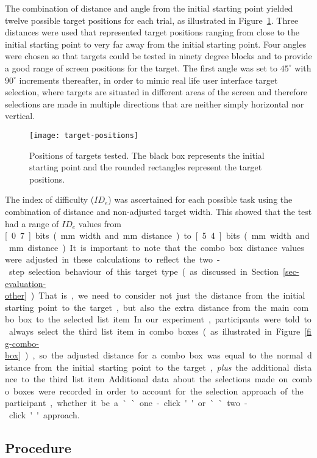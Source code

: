 \documentclass[reviewcopy]{elsart}
\begin{document}
The combination of distance and angle from the initial starting point
yielded twelve possible target positions for each trial, as illustrated
in Figure~\ref{fig-target-positions}. Three distances were used that
represented target positions ranging from close to the initial starting
point to very far away from the initial starting point. Four angles were
chosen so that targets could be tested in ninety degree blocks and to
provide a good range of screen positions for the target. The first angle
was set to \(45^{\circ}\) with \(90^{\circ}\) increments thereafter, in
order to mimic real life user interface target selection, where targets
are situated in different areas of the screen and therefore selections
are made in multiple directions that are neither simply horizontal nor
vertical.


\begin{figure}
	\centering
	\texttt{[image: target-positions]}
	\caption{Positions of targets tested. The black box represents the
	initial starting point and the rounded rectangles represent the
	target positions.}
	\label{fig-target-positions}
\end{figure}


The index of difficulty (\(\mathit{ID}_{e}\)) was ascertained for each
possible task using the combination of distance and non-adjusted target
width. This showed that the test had a range of \(\mathit{ID}_{e}\)
values from \unit[0.7]{bits} (\unit[63]{mm} width and \unit[160]{mm}
distance) to \unit[5.4]{bits} (\unit[4]{mm} width and \unit[40]{mm}
distance). It is important to note that the combo box distance values
were adjusted in these calculations to reflect the two-step selection
behaviour of this target type (as discussed in
Section~\ref{sec-evaluation-other}). That is, we need to consider not
just the distance from the initial starting point to the target, but
also the extra distance from the main combo box to the selected list
item. In our experiment, participants were told to always select the
third list item in combo boxes (as illustrated in
Figure~\ref{fig-combo-box}), so the adjusted distance for a combo box
was equal to the normal distance from the initial starting point to the
target, \emph{plus} the additional distance to the third list item.
Additional data about the selections made on combo boxes were recorded
in order to account for the selection approach of the participant,
whether it be a ``one-click'' or ``two-click'' approach.


\subsection{Procedure}
\label{sec-method-procedure}
\end{document}
